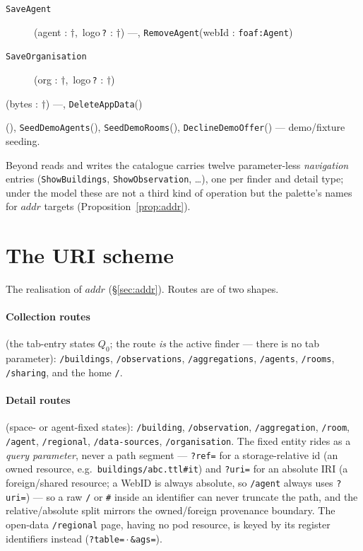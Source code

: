 \documentclass[11pt,a4paper]{article}
\theoremstyle{remark}
\newcommand{\addr}{\mathit{addr}}
\begin{document}
\begin{description}
\begin{description}
\item[\texttt{SaveAgent}] (agent : $\dagger$,\ logo\,\texttt{?} : $\dagger$) ---,
  \texttt{RemoveAgent}(webId : \texttt{foaf:Agent})
\item[\texttt{SaveOrganisation}] (org : $\dagger$,\ logo\,\texttt{?} : $\dagger$)
\end{description}
\item[Account]\hfill
\begin{description}\setlength\itemsep{0pt}
\item[\texttt{RestoreArchive}] (bytes : $\dagger$) ---, \texttt{DeleteAppData}()
\item[\texttt{SeedDemoBuildings}] (), \texttt{SeedDemoAgents}(), \texttt{SeedDemoRooms}(), \texttt{DeclineDemoOffer}() ---
  demo/fixture seeding.
\end{description}
\end{description}

Beyond reads and writes the catalogue carries twelve parameter-less
\emph{navigation} entries (\texttt{ShowBuildings}, \texttt{ShowObservation},
\ldots), one per finder and detail type; under the model these are not a third
kind of operation but the palette's names for $\addr$ targets
(Proposition~\ref{prop:addr}).

\cleardoublepage
\section{The URI scheme}\label{app:uri}

The realisation of $\addr$ (\S\ref{sec:addr}). Routes are of two shapes.

\paragraph{Collection routes} (the tab-entry states $Q_0$; the route \emph{is}
the active finder --- there is no tab parameter):
\texttt{/buildings}, \texttt{/observations}, \texttt{/aggregations},
\texttt{/agents}, \texttt{/rooms}, \texttt{/sharing}, and the home \texttt{/}.

\paragraph{Detail routes} (space- or agent-fixed states):
\texttt{/building}, \texttt{/observation}, \texttt{/aggregation}, \texttt{/room},
\texttt{/agent}, \texttt{/regional}, \texttt{/data-sources},
\texttt{/organisation}. The fixed entity rides as a \emph{query parameter},
never a path segment --- \texttt{?ref=} for a storage-relative id (an owned
resource, e.g.\ \texttt{buildings/abc.ttl\#it}) and \texttt{?uri=} for an
absolute IRI (a foreign/shared resource; a WebID is always absolute, so
\texttt{/agent} always uses \texttt{?uri=}) --- so a raw \texttt{/} or \texttt{\#}
inside an identifier can never truncate the path, and the relative/absolute split
mirrors the owned/foreign provenance boundary. The open-data
\texttt{/regional} page, having no pod resource, is keyed by its register
identifiers instead (\texttt{?table=}\,$\cdot$\,\texttt{\&ags=}).
\end{document}
